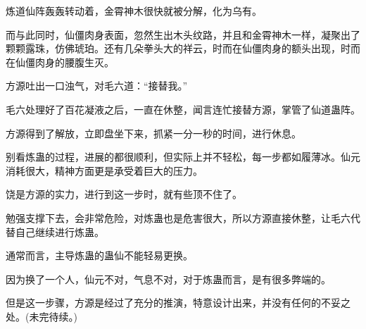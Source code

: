 \begin{this_body}
炼道仙阵轰轰转动着，金霄神木很快就被分解，化为乌有。

而与此同时，仙僵肉身表面，忽然生出木头纹路，并且和金霄神木一样，凝聚出了颗颗露珠，仿佛琥珀。还有几朵拳头大的祥云，时而在仙僵肉身的额头出现，时而在仙僵肉身的腰腹生灭。

方源吐出一口浊气，对毛六道：“接替我。”

毛六处理好了百花凝液之后，一直在休整，闻言连忙接替方源，掌管了仙道蛊阵。

方源得到了解放，立即盘坐下来，抓紧一分一秒的时间，进行休息。

别看炼蛊的过程，进展的都很顺利，但实际上并不轻松，每一步都如履薄冰。仙元消耗很大，精神方面更是承受着巨大的压力。

饶是方源的实力，进行到这一步时，就有些顶不住了。

勉强支撑下去，会非常危险，对炼蛊也是危害很大，所以方源直接休整，让毛六代替自己继续进行炼蛊。

通常而言，主导炼蛊的蛊仙不能轻易更换。

因为换了一个人，仙元不对，气息不对，对于炼蛊而言，是有很多弊端的。

但是这一步骤，方源是经过了充分的推演，特意设计出来，并没有任何的不妥之处。(未完待续。)

\end{this_body}

